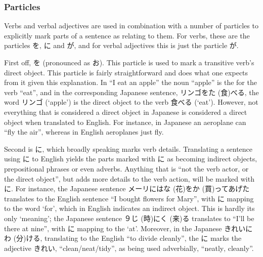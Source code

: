 \documentclass[11pt, b5paper, twoside, openright, onecolumn]{book}
\makeatletter
\newcommand*{\rubystack}[2]{{\relscale{0.5}%
  \begin{tabular}[b]{@{}c@{}}%
    {#1}\\%
   {\textscale{2}{#2}}%
  \end{tabular}}%
}
\DeclareRobustCommand*{\ruby}[2]{%
  \mbox{%
    \setlength{\parskip}{0ex}%
    \BeginAccSupp{method=pdfstringdef,ActualText={#1}}%
      \rubystack{\phantom{#2}}{#1}%
      \llap{%
        \rubystack{#2}{\phantom{#1}}%
      }%
    \EndAccSupp{}%
  }%
}
\renewcommand*{\ruby}[2]{#2 (#1)}%
\makeatother
\begin{document}
\subsubsection{Particles}

Verbs and verbal adjectives are used in combination with a number of particles to explicitly mark parts of a sentence as relating to them. For verbs‚ these are the particles を‚ に and が‚ and for verbal adjectives this is just the particle が.

First off‚ を (pronounced as お). This particle is used to mark a transitive verb’s direct object. This particle is fairly straightforward and does what one expects from it given this explanation. In “I eat an apple” the noun “apple” is the  for the verb “eat”‚ and in the corresponding Japanese sentence‚ リンゴを\ruby{食}{た}べる‚ the word リンゴ (‘apple’) is the direct object to the verb 食べる (‘eat’). However‚ not everything that is considered a direct object in Japanese is considered a direct object when translated to English. For instance‚ in Japanese an aeroplane can “fly the air”‚ whereas in English aeroplanes just fly.

Second is に‚ which broadly speaking marks verb details. Translating a sentence using に to English yields the parts marked with に as becoming indirect objects‚ prepositional phrases or even adverbs. Anything that is “not the verb actor‚ or the direct object”‚ but adds more details to the verb action‚ will be marked with に. For instance‚ the Japanese sentence メーリに\ruby{花}{はな}を\ruby{買}{か}ってあげた translates to the English sentence “I bought flowers for Mary”‚ with に mapping to the word ‘for’‚ which in English indicates an indirect object. This is hardly its only ‘meaning’; the Japanese sentence ９\ruby{時}{じ}に\ruby{来}{く}る translates to “I’ll be there at nine”‚ with に mapping to the  ‘at’. Moreover‚ in the Japanese きれいに\ruby{分}{わ}ける‚ translating to the English “to divide cleanly”‚ the に marks the adjective きれい‚ “clean/neat/tidy”‚ as being used adverbially‚ “neatly‚ cleanly”.
\end{document}
